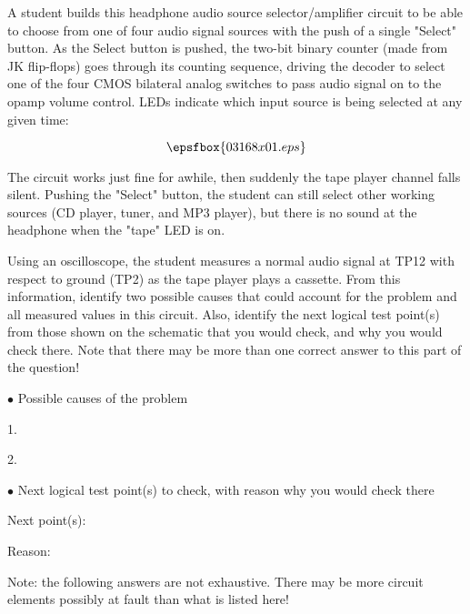 

A student builds this headphone audio source selector/amplifier circuit to be able to choose from one of four audio signal sources with the push of a single "Select" button.  As the Select button is pushed, the two-bit binary counter (made from JK flip-flops) goes through its counting sequence, driving the decoder to select one of the four CMOS bilateral analog switches to pass audio signal on to the opamp volume control.  LEDs indicate which input source is being selected at any given time:

$$\epsfbox{03168x01.eps}$$

The circuit works just fine for awhile, then suddenly the tape player channel falls silent.  Pushing the "Select" button, the student can still select other working sources (CD player, tuner, and MP3 player), but there is no sound at the headphone when the "tape" LED is on.

Using an oscilloscope, the student measures a normal audio signal at TP12 with respect to ground (TP2) as the tape player plays a cassette.  From this information, identify two possible causes that could account for the problem and all measured values in this circuit.  Also, identify the next logical test point(s) from those shown on the schematic that you would check, and why you would check there.  Note that there may be more than one correct answer to this part of the question!

\medskip
\goodbreak
\item{$\bullet$} Possible causes of the problem
\item{1.}
\item{2.} 
\medskip

\medskip
\item{$\bullet$} Next logical test point(s) to check, with reason why you would check there
\item{Next point(s):}
\item{Reason:}
\medskip







Note: the following answers are not exhaustive.  There may be more circuit elements possibly at fault than what is listed here!

